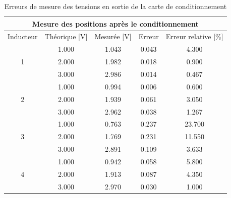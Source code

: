 \begin{table}[H]
    \centering
    \begin{tabular}{|c|c|c|c|c|}
        \hline
        \multicolumn{5}{|c|}{\textbf{Mesure des positions après le conditionnement}}                 \\ \hline
        Inducteur          & Théorique {[}V{]} & Mesurée {[}V{]} & Erreur & Erreur relative {[}\%{]} \\ \hline
        \multirow{3}{*}{1} & 1.000             & 1.043           & 0.043  & 4.300                    \\ \cline{2-5}
                           & 2.000             & 1.982           & 0.018  & 0.900                    \\ \cline{2-5}
                           & 3.000             & 2.986           & 0.014  & 0.467                    \\ \hline
        \multirow{3}{*}{2} & 1.000             & 0.994           & 0.006  & 0.600                    \\ \cline{2-5}
                           & 2.000             & 1.939           & 0.061  & 3.050                    \\ \cline{2-5}
                           & 3.000             & 2.962           & 0.038  & 1.267                    \\ \hline
        \multirow{3}{*}{3} & 1.000             & 0.763           & 0.237  & 23.700                   \\ \cline{2-5}
                           & 2.000             & 1.769           & 0.231  & 11.550                   \\ \cline{2-5}
                           & 3.000             & 2.891           & 0.109  & 3.633                    \\ \hline
        \multirow{3}{*}{4} & 1.000             & 0.942           & 0.058  & 5.800                    \\ \cline{2-5}
                           & 2.000             & 1.913           & 0.087  & 4.350                    \\ \cline{2-5}
                           & 3.000             & 2.970           & 0.030  & 1.000                    \\ \hline
    \end{tabular}
    \caption{Erreurs de mesure des tensions en sortie de la carte de conditionnement}
    \label{tab:premier_mesure_pos_cond}
\end{table}

